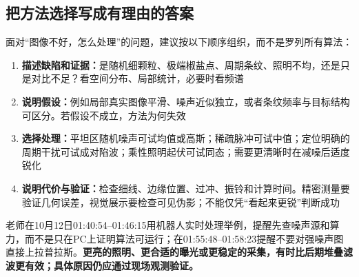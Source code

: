 \subsection{把方法选择写成有理由的答案}
面对“图像不好，怎么处理”的问题，建议按以下顺序组织，而不是罗列所有算法：
\begin{enumerate}
\item \textbf{描述缺陷和证据：}是随机细颗粒、极端椒盐点、周期条纹、照明不均，还是只是对比不足？看空间分布、局部统计，必要时看频谱
\item \textbf{说明假设：}例如局部真实图像平滑、噪声近似独立，或者条纹频率与目标结构可区分。若假设不成立，方法为何失效
\item \textbf{选择处理：}平坦区随机噪声可试均值或高斯；稀疏脉冲可试中值；定位明确的周期干扰可试成对陷波；乘性照明起伏可试同态；需要更清晰时在减噪后适度锐化
\item \textbf{说明代价与验证：}检查细线、边缘位置、过冲、振铃和计算时间。精密测量要验证几何误差，视觉展示要检查可见伪影；不能仅凭“看起来更锐”判断成功
\end{enumerate}
老师在10月12日01:40:54--01:46:15用机器人实时处理举例，提醒先查噪声源和算力，而不是只在PC上证明算法可运行；在01:55:48--01:58:23提醒不要对强噪声图直接上拉普拉斯。\textbf{更亮的照明、更合适的曝光或更稳定的采集，有时比后期堆叠滤波更有效；具体原因仍应通过现场观测验证。}

